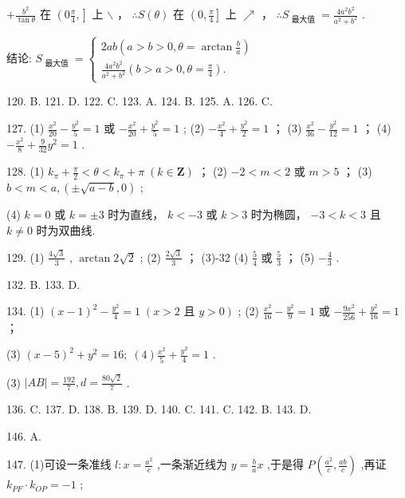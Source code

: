 \documentclass[10pt]{article}
\begin{document}
\(+ \frac{{b}^{2}}{\tan \theta }\) 在 \(\left( {0\frac{\pi }{4},}\right\rbrack\) 上 \(\smallsetminus\) ， \(\therefore S\left( \theta \right)\) 在 \(\left( {0,\frac{\pi }{4}}\right\rbrack\) 上 \(\nearrow\) ， \(\therefore {S}_{\text{ 最大值 }} = \frac{4{a}^{2}{b}^{2}}{{a}^{2} + {b}^{2}}\) .

结论: \({S}_{\text{ 最大值 }} = \left\{  \begin{array}{l} {2ab}\left( {a > b > 0,\theta  = \arctan \frac{b}{a}}\right) \\  \frac{4{a}^{2}{b}^{2}}{{a}^{2} + {b}^{2}}\left( {b > a > 0,\theta  = \frac{\pi }{4}}\right) . \end{array}\right.\)

120. B. 121. D. 122. C. 123. A. 124. B. 125. A. 126. C.

127. (1) \(\frac{{x}^{2}}{20} - \frac{{y}^{2}}{5} = 1\) 或 \(- \frac{{x}^{2}}{20} + \frac{{y}^{2}}{5} = 1\) ; (2) \(- \frac{{x}^{2}}{4} + \frac{{y}^{2}}{2} = 1\) ； (3) \(\frac{{x}^{2}}{36} - \frac{{y}^{2}}{12} = 1\) ； (4) \(- \frac{{x}^{2}}{8} + \frac{9}{32}{y}^{2} = 1\) .

128. (1) \({k}_{\pi } + \frac{\pi }{2} < \theta  < {k}_{\pi } + \pi \;\left( {k \in  \mathbf{Z}}\right)\) ； (2) \(- 2 < m < 2\) 或 \(m > 5\) ； (3) \(b < m < a,\left( {\pm \sqrt{a - b},0}\right)\) ;

(4) \(k = 0\) 或 \(k =  \pm  3\) 时为直线， \(k <  - 3\) 或 \(k > 3\) 时为椭圆， \(- 3 < k < 3\) 且 \(k \neq  0\) 时为双曲线.

129. (1) \(\frac{4\sqrt{3}}{3}\) , \(\arctan 2\sqrt{2}\) ; (2) \(\frac{2\sqrt{3}}{3}\) ； (3)-32 (4) \(\frac{5}{4}\) 或 \(\frac{5}{3}\) ； (5) \(- \frac{4}{3}\) .

132. B. 133. D.

134. (1) \({\left( x - 1\right) }^{2} - \frac{{y}^{2}}{4} = 1\;\left( {x > 2\text{ 且 }y > 0}\right)\) ; (2) \(\frac{{x}^{2}}{16} - \frac{{y}^{2}}{9} = 1\) 或 \(- \frac{9{x}^{2}}{256} + \frac{{y}^{2}}{16} = 1\) ；

(3) \({\left( x - 5\right) }^{2} + {y}^{2} = {16};\;\left( 4\right) \frac{{x}^{2}}{5} + \frac{{y}^{2}}{4} = 1\) .

(3) \(\left| {AB}\right|  = \frac{192}{7},d = \frac{{80}\sqrt{2}}{7}\) .

136. C. 137. D. 138. B. 139. D. 140. C. 141. C. 142. B. 143. D.

146. A.

147. (1)可设一条准线 \(l : x = \frac{{a}^{2}}{c}\) ,一条渐近线为 \(y = \frac{b}{a}x\) ,于是得 \(P\left( {\frac{{a}^{2}}{c},\frac{ab}{c}}\right)\) ,再证 \({k}_{PF} \cdot  {k}_{OP} =  - 1\) ;
\end{document}
